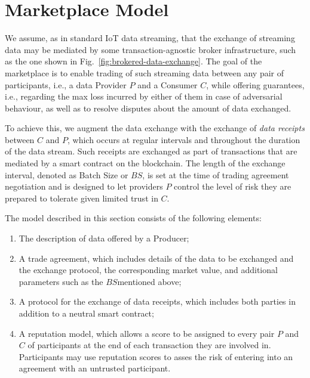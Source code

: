 \documentclass[letterpaper, 10 pt, conference]{ieeeconf}  %
\newcommand{\bs}{\ensuremath{\mathit{BS}}}
\begin{document}
\section{Marketplace Model} \label{sec:MKModel}

We assume, as in standard IoT data streaming, that the exchange of streaming data may be mediated by some transaction-agnostic broker infrastructure, such as the one shown in Fig.~\ref{fig:brokered-data-exchange}.
The goal of the marketplace is to enable trading of such streaming data between any pair of  participants, i.e., a data Provider  $P$ and a Consumer $C$, while offering guarantees, i.e., 
regarding the max  loss incurred by either of them in case of adversarial behaviour, as well as to resolve disputes about the amount of data exchanged.

To achieve this, we augment the data exchange with the exchange of \textit{data receipts} between $C$ and $P$, which occurs at regular intervals and throughout the duration of the data stream. Such receipts are exchanged as part of transactions that are mediated by a smart contract on the blockchain. 
The length of the exchange interval, denoted as Batch Size or \bs, is set at the time of trading agreement negotiation and is designed to let providers $P$ control the level of risk they are prepared to tolerate given limited trust in $C$.

The model described in this section consists of the following elements:
\begin{enumerate}
	
	\item The description of data offered by a Producer;
	
	\item A trade agreement, which includes details of the data to be exchanged and the exchange protocol, the corresponding market value, and additional parameters such as the \bs mentioned above;
	
	\item A protocol for the exchange of data receipts, which includes both parties in addition to a neutral smart contract;
	
	\item A reputation model, which allows a score to be assigned to every pair $P$ and $C$ of participants at the end of each transaction they are involved in. 
	Participants may use reputation scores to asses the risk of entering into an agreement with an untrusted participant.

\end{enumerate}
\end{document}

